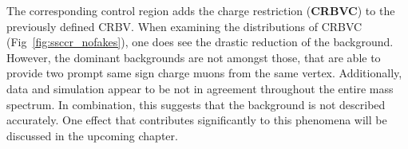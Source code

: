 The corresponding control region adds the charge restriction (\textbf{CRBVC}) to the previously defined CRBV. When examining the distributions of CRBVC (Fig~\ref{fig:ssccr_nofakes}), one does see the drastic reduction of the background. However, the dominant backgrounds are not amongst those, that are able to provide two prompt same sign charge muons from the same vertex. Additionally, data and simulation appear to be not in agreement throughout the entire mass spectrum. In combination, this suggests that the background is not described accurately. One effect that contributes significantly to this phenomena will be discussed in the upcoming chapter.


